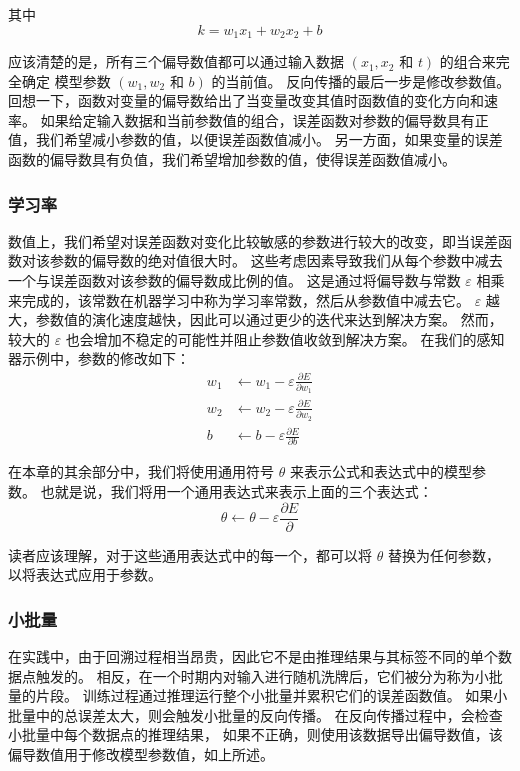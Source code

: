 其中
$$
k=w_{1} x_{1}+w_{2} x_{2}+b
$$

应该清楚的是，所有三个偏导数值都可以通过输入数据 $\left(x_{1}, x_{2}\right.$ 
和 $\left.t\right)$ 的组合来完全确定 模型参数 $\left(w_{1}, w_{2}\right.$ 和 $\left.b\right)$ 的当前值。 
反向传播的最后一步是修改参数值。 回想一下，函数对变量的偏导数给出了当变量改变其值时函数值的变化方向和速率。 
如果给定输入数据和当前参数值的组合，误差函数对参数的偏导数具有正值，我们希望减小参数的值，以便误差函数值减小。 
另一方面，如果变量的误差函数的偏导数具有负值，我们希望增加参数的值，使得误差函数值减小。

\subsubsection{学习率}
数值上，我们希望对误差函数对变化比较敏感的参数进行较大的改变，即当误差函数对该参数的偏导数的绝对值很大时。 
这些考虑因素导致我们从每个参数中减去一个与误差函数对该参数的偏导数成比例的值。 
这是通过将偏导数与常数 $\varepsilon$ 相乘来完成的，该常数在机器学习中称为学习率常数，然后从参数值中减去它。 
$\varepsilon$ 越大，参数值的演化速度越快，因此可以通过更少的迭代来达到解决方案。 
然而，较大的 $\varepsilon$ 也会增加不稳定的可能性并阻止参数值收敛到解决方案。 在我们的感知器示例中，参数的修改如下：
$$
\begin{aligned}
w_{1} & \leftarrow w_{1}-\varepsilon \frac{\partial E}{\partial w_{1}} \\
w_{2} & \leftarrow w_{2}-\varepsilon \frac{\partial E}{\partial w_{2}} \\
b & \leftarrow b-\varepsilon \frac{\partial E}{\partial b}
\end{aligned}
$$

在本章的其余部分中，我们将使用通用符号 $\theta$ 来表示公式和表达式中的模型参数。 
也就是说，我们将用一个通用表达式来表示上面的三个表达式：
$$
\theta \leftarrow \theta-\varepsilon \frac{\partial E}{\partial}
$$

读者应该理解，对于这些通用表达式中的每一个，都可以将 $\theta$ 替换为任何参数，以将表达式应用于参数。

\subsubsection{小批量}
在实践中，由于回溯过程相当昂贵，因此它不是由推理结果与其标签不同的单个数据点触发的。 
相反，在一个时期内对输入进行随机洗牌后，它们被分为称为小批量的片段。 
训练过程通过推理运行整个小批量并累积它们的误差函数值。 如果小批量中的总误差太大，则会触发小批量的反向传播。 
在反向传播过程中，会检查小批量中每个数据点的推理结果，
如果不正确，则使用该数据导出偏导数值，该偏导数值用于修改模型参数值，如上所述。

